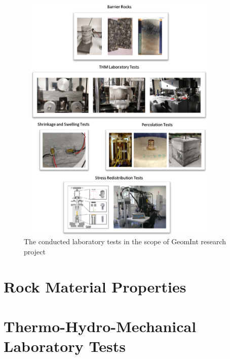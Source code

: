 \begin{figure}[!ht]
\centering
\includegraphics[width=10cm,height=12cm]{figures/Amir_Experiment.png}
\caption{The conducted laboratory tests in the scope of GeomInt research project}
\label{fig:Amir_Experiment}
\end{figure} 



\section{Rock Material Properties}

\clearpage

\clearpage

\clearpage
\section{Thermo-Hydro-Mechanical Laboratory Tests}
